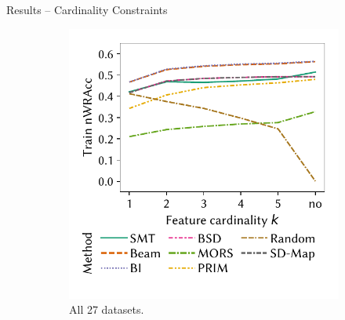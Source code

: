 \documentclass[en, navbaroff]{sdqbeamer}
\begin{document}
\begin{frame}[t]{Results -- Cardinality Constraints}
	\begin{figure}
		\centering
		\begin{subfigure}[t]{0.35\textwidth}
			\centering
			\includegraphics[width=\textwidth, trim=10 25 10 10, clip]{plots/csd-cardinality-train-nwracc-all-datasets.pdf}
			\caption{All 27 datasets.}
			\label{fig:csd:cardinality-train-nwracc-all-datasets}
		\end{subfigure}
		\pause
		\hspace{\kitcolumnsep}
		\begin{subfigure}[t]{0.35\textwidth}

\end{subfigure}
\end{figure}
\end{frame}
\end{document}
